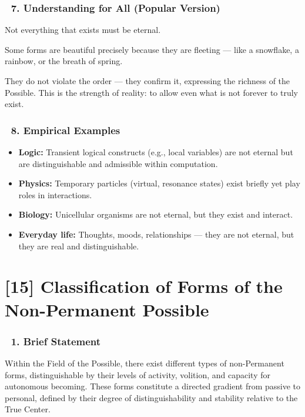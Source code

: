 \documentclass[12pt]{article}
\begin{document}
\subsubsection*{🔹 7. Understanding for All (Popular Version)}

Not everything that exists must be eternal.

Some forms are beautiful precisely because they are fleeting — like a snowflake, a rainbow, or the breath of spring.

They do not violate the order — they confirm it, expressing the richness of the Possible. This is the strength of reality: to allow even what is not forever to truly exist.

\subsubsection*{🔹 8. Empirical Examples}

\begin{itemize}
\item \textbf{Logic:} Transient logical constructs (e.g., local variables) are not eternal but are distinguishable and admissible within computation.
\item \textbf{Physics:} Temporary particles (virtual, resonance states) exist briefly yet play roles in interactions.
\item \textbf{Biology:} Unicellular organisms are not eternal, but they exist and interact.
\item \textbf{Everyday life:} Thoughts, moods, relationships — they are not eternal, but they are real and distinguishable.
\end{itemize}



\section*{[15] Classification of Forms of the Non-Permanent Possible}

\subsubsection*{🔹 1. Brief Statement}

Within the Field of the Possible, there exist different types of non-Permanent forms, distinguishable by their levels of activity, volition, and capacity for autonomous becoming. These forms constitute a directed gradient from passive to personal, defined by their degree of distinguishability and stability relative to the True Center.
\end{document}
